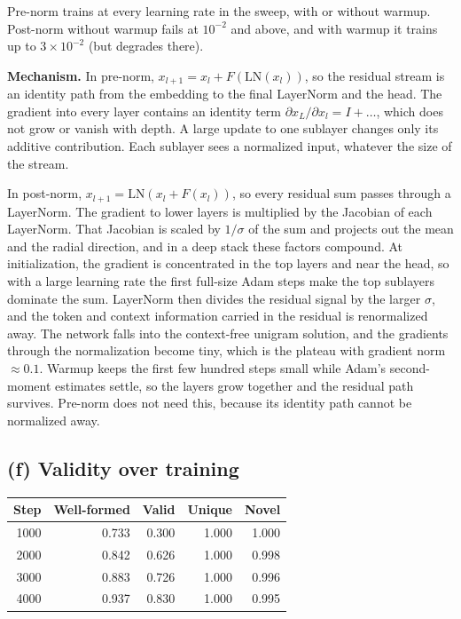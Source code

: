 \documentclass[11pt]{article}
\begin{document}
Pre-norm trains at every learning rate in the sweep, with or without warmup.
Post-norm without warmup fails at $10^{-2}$ and above, and with warmup it
trains up to $3\times10^{-2}$ (but degrades there).

\textbf{Mechanism.} In pre-norm, $x_{l+1}=x_l+F(\mathrm{LN}(x_l))$, so the
residual stream is an identity path from the embedding to the final
LayerNorm and the head. The gradient into every layer contains an identity term
$\partial x_L/\partial x_l = I + \ldots$, which does not grow or vanish with depth. A
large update to one sublayer changes only its additive contribution. Each sublayer
sees a normalized input, whatever the size of the stream.

In post-norm, $x_{l+1}=\mathrm{LN}(x_l+F(x_l))$, so every residual sum passes through a LayerNorm.
The gradient to lower layers is multiplied by the Jacobian of each LayerNorm.
That Jacobian is scaled by $1/\sigma$ of the sum and projects out the mean and
the radial direction, and in a deep stack these factors compound. At initialization, the gradient
is concentrated in the top layers and near the head, so with a large learning rate the first
full-size Adam steps make the top sublayers dominate the sum. LayerNorm then divides the residual
signal by the larger $\sigma$, and the token and context information carried in the residual
is renormalized away. The network falls into the context-free unigram solution, and the
gradients through the normalization become tiny, which is the plateau with gradient norm $\approx0.1$.
Warmup keeps the first few hundred steps small while Adam's second-moment estimates
settle, so the layers grow together and the residual path survives. Pre-norm does not need
this, because its identity path cannot be normalized away.

\subsection*{(f) Validity over training}

\begin{table}[H]\centering
\begin{tabular}{rrrrr}\toprule
Step & Well-formed & Valid & Unique & Novel\\\midrule
1000 & 0.733 & 0.300 & 1.000 & 1.000\\
2000 & 0.842 & 0.626 & 1.000 & 0.998\\
3000 & 0.883 & 0.726 & 1.000 & 0.996\\
4000 & 0.937 & 0.830 & 1.000 & 0.995\\\bottomrule
\end{tabular}\end{table}
\end{document}

